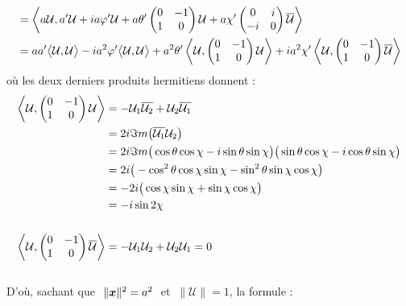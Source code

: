 \begin{annexe}
\begin{demo}
\begin{align*}
		&= \left\langle a\mathcal{U}, a'\mathcal{U} + ia\varphi' \mathcal{U} + a\theta'\begin{pmatrix} 0 & -1 \\ 1 & 0 \end{pmatrix}\mathcal{U} + a\chi'\begin{pmatrix} 0 & i \\ -i & 0 \end{pmatrix}\overline{\mathcal{U}}\right\rangle \\
		&= aa' \big\langle \mathcal{U}, \mathcal{U}\big\rangle  - ia^2\varphi' \big\langle \mathcal{U}, \mathcal{U}\big\rangle  + a^2\theta'\left\langle \mathcal{U}, \begin{pmatrix} 0 & -1 \\ 1 & 0 \end{pmatrix}\mathcal{U}\right\rangle + ia^2\chi'\left\langle \mathcal{U}, \begin{pmatrix} 0 & -1 \\ 1 & 0 \end{pmatrix}\overline{\mathcal{U}}\right\rangle
	\end{align*}
	où les deux derniers produits hermitiens donnent :
	\begin{align*}
		\left\langle \mathcal{U}, \begin{pmatrix} 0 & -1 \\ 1 & 0 \end{pmatrix}\mathcal{U}\right\rangle &= -\mathcal{U}_1\overline{\mathcal{U}_2} + \mathcal{U}_2\overline{\mathcal{U}_1} \\
		&= 2i\Im m\big(\overline{\mathcal{U}_1} \mathcal{U}_2\big) \\
		&= 2i\Im m\big(\cos\theta \cos\chi - i \sin\theta \sin\chi \big) \big( \sin\theta \cos\chi - i \cos\theta \sin\chi \big) \\
		&= 2i\big(-\cos^2\theta \cos\chi \sin\chi - \sin^2\theta \sin\chi \cos\chi \big) \\
		&= -2i\big( \cos\chi \sin\chi + \sin\chi \cos\chi \big) \\
		&= -i\sin2\chi 
		\\ \\
		\left\langle \mathcal{U}, \begin{pmatrix} 0 & -1 \\ 1 & 0 \end{pmatrix}\overline{\mathcal{U}}\right\rangle &= -\mathcal{U}_1\mathcal{U}_2 + \mathcal{U}_2\mathcal{U}_1 = 0
	\end{align*}
	\\
	D'où, sachant que $\ \|\bf{x}\|^2=a^2\ $ et $\ \|\mathcal{U}\|=1$, la formule :

\end{demo}
\end{annexe}
